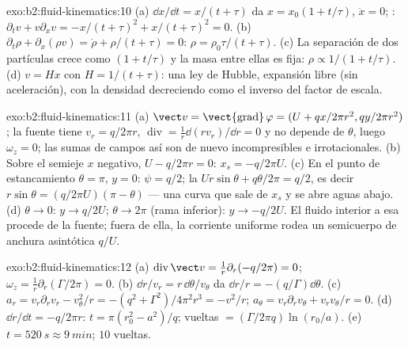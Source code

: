 \begin{solution}{exo:b2:fluid-kinematics:10}
(a) $\dd x/\dd t = x/(t + \tau)$ da $x = x_0(1 + t/\tau)$, $\ddot x = 0$;
: $\partial_tv + v\partial_xv = -x/(t + \tau)^2 + x/(t + \tau)^2
= 0$. (b) $\partial_t\rho + \partial_x(\rho v) = \dot\rho + \rho/(t + \tau) = 0$: $\rho =
\rho_0\tau/(t + \tau)$. (c) La separación de dos partículas crece como $(1 + t/\tau)$
y la masa entre ellas es fija: $\rho \propto 1/(1 + t/\tau)$. (d) $v =
Hx$ con $H = 1/(t + \tau)$: una ley de Hubble, expansión libre (sin
aceleración), con la densidad decreciendo como el inverso del factor de escala.
\end{solution}

\begin{solution}{exo:b2:fluid-kinematics:11}
(a) $\vect v = \operatorname{\vect{grad}}\varphi = (U + qx/2\pi r^2, qy/2\pi r^2)$;
la fuente tiene $v_r = q/2\pi r$, $\operatorname{div} = \frac1r\dd(rv_r)/\dd r
= 0$ y no depende de $\theta$, luego $\omega_z = 0$; las sumas de campos así
son de nuevo incompresibles e irrotacionales. (b) Sobre el semieje $x$
negativo, $U - q/2\pi r = 0$: $x_s = -q/2\pi U$. (c) En el punto de estancamiento $\theta =
\pi$, $y = 0$: $\psi = q/2$; la  $Ur\sin\theta + q\theta/2\pi = q/2$,
es decir $r\sin\theta = (q/2\pi U)(\pi - \theta)$ --- una curva que sale de $x_s$ y
se abre aguas abajo. (d) $\theta \to 0$: $y \to q/2U$; $\theta \to 2\pi$ (rama
inferior): $y \to -q/2U$. El fluido interior a esa  procede
de la fuente; fuera de ella, la corriente uniforme rodea un semicuerpo de
anchura asintótica $q/U$.
\end{solution}

\begin{solution}{exo:b2:fluid-kinematics:12}
(a) $\operatorname{div}\vect v = \frac1r\partial_r(-q/2\pi) = 0$; $\omega_z =
\frac1r\partial_r(\Gamma/2\pi) = 0$. (b) $\dd r/v_r = r\,\dd\theta/v_\theta$ da
$\dd r/r = -(q/\Gamma)\dd\theta$. (c) $a_r = v_r\partial_rv_r - v_\theta^2/r =
-(q^2 + \Gamma^2)/4\pi^2r^3 = -v^2/r$; $a_\theta = v_r\partial_rv_\theta + v_rv_\theta/r
= 0$. (d) $\dd r/\dd t = -q/2\pi r$: $t = \pi(r_0^2 - a^2)/q$; vueltas
$= (\Gamma/2\pi q)\ln(r_0/a)$. (e) $t = \qty{520}{s} \approx \qty{9}{min}$; $10$
vueltas.
\end{solution}

